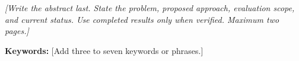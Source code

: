 \textit{[Write the abstract last. State the problem, proposed approach, evaluation scope, and current status. Use completed results only when verified. Maximum two pages.]}

\medskip
\noindent\textbf{Keywords:} [Add three to seven keywords or phrases.]
